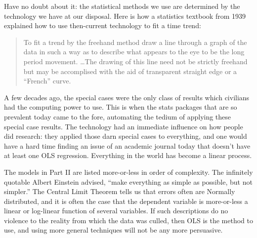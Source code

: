 Have no doubt about it: the statistical methods we use are determined by
the technology we have at our disposal. Here is how a statistics textbook from 1939
\citep[p 43]{arkin:colton} explained how to use then-current technology to fit
a time trend:
\begin{quote}
To fit a trend by the freehand method draw a line through a graph of
the data in such a way as to describe what
appears to the eye to be the long period movement. \dots The drawing of
this line need not be strictly freehand but
may be accomplised with the aid of transparent straight edge or a
``French'' curve.
\end{quote}

A few decades ago, the special cases were the only class of results which
civilians had the computing power to use. This is when the stats packages
that are so prevalent today came to the fore, automating the tedium of
applying these special case results. The technology had an immediate
influence on how people did research: they applied those darn special
cases to everything, and one would have a hard time finding an issue of an
academic journal today that doesn't have at least one OLS regression.
Everything in the world has become a linear process.



The models in Part II are listed more-or-less in order of complexity.
The infinitely quotable Albert Einstein advised, ``make everything as
simple as possible, but not simpler.''  
The Central Limit Theorem tells us that errors often are
Normally distributed, and it is often the case that the dependent
variable is more-or-less a linear or log-linear function of several
variables. If such descriptions do no violence to the reality from
which the data was culled, then OLS is the method to use, and using more
general techniques will not be any more persuasive. 

